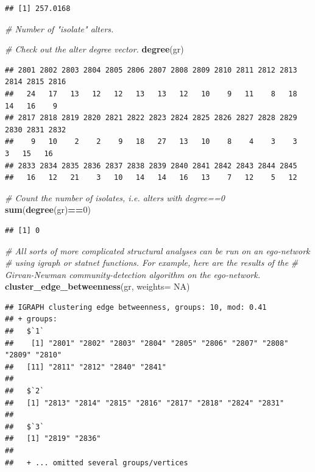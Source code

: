 \documentclass[
]{book}
\newenvironment{Shaded}{\begin{snugshade}}{\end{snugshade}}
\newcommand{\AttributeTok}[1]{\textcolor[rgb]{0.13,0.29,0.53}{#1}}
\newcommand{\CommentTok}[1]{\textcolor[rgb]{0.56,0.35,0.01}{\textit{#1}}}
\newcommand{\ConstantTok}[1]{\textcolor[rgb]{0.56,0.35,0.01}{#1}}
\newcommand{\DecValTok}[1]{\textcolor[rgb]{0.00,0.00,0.81}{#1}}
\newcommand{\FunctionTok}[1]{\textcolor[rgb]{0.13,0.29,0.53}{\textbf{#1}}}
\newcommand{\NormalTok}[1]{#1}
\newcommand{\SpecialCharTok}[1]{\textcolor[rgb]{0.81,0.36,0.00}{\textbf{#1}}}
\begin{document}
\begin{verbatim}
## [1] 257.0168
\end{verbatim}

\begin{Shaded}
\begin{Highlighting}[]
\CommentTok{\# Number of "isolate" alters.}

\CommentTok{\# Check out the alter degree vector.}
\FunctionTok{degree}\NormalTok{(gr)}
\end{Highlighting}
\end{Shaded}

\begin{verbatim}
## 2801 2802 2803 2804 2805 2806 2807 2808 2809 2810 2811 2812 2813 2814 2815 2816 
##   24   17   13   12   12   13   13   12   10    9   11    8   18   14   16    9 
## 2817 2818 2819 2820 2821 2822 2823 2824 2825 2826 2827 2828 2829 2830 2831 2832 
##    9   10    2    2    9   18   27   13   10    8    4    3    3    3   15   16 
## 2833 2834 2835 2836 2837 2838 2839 2840 2841 2842 2843 2844 2845 
##   16   12   21    3   10   14   14   16   13    7   12    5   12
\end{verbatim}

\begin{Shaded}
\begin{Highlighting}[]
\CommentTok{\# Count the number of isolates, i.e. alters with degree==0}
\FunctionTok{sum}\NormalTok{(}\FunctionTok{degree}\NormalTok{(gr)}\SpecialCharTok{==}\DecValTok{0}\NormalTok{)}
\end{Highlighting}
\end{Shaded}

\begin{verbatim}
## [1] 0
\end{verbatim}

\begin{Shaded}
\begin{Highlighting}[]
\CommentTok{\# All sorts of more complicated structural analyses can be run on an ego{-}network}
\CommentTok{\# using igraph or statnet functions. For example, here are the results of the}
\CommentTok{\# Girvan{-}Newman community{-}detection algorithm on the ego{-}network.}
\FunctionTok{cluster\_edge\_betweenness}\NormalTok{(gr, }\AttributeTok{weights=} \ConstantTok{NA}\NormalTok{)}
\end{Highlighting}
\end{Shaded}

\begin{verbatim}
## IGRAPH clustering edge betweenness, groups: 10, mod: 0.41
## + groups:
##   $`1`
##    [1] "2801" "2802" "2803" "2804" "2805" "2806" "2807" "2808" "2809" "2810"
##   [11] "2811" "2812" "2840" "2841"
##   
##   $`2`
##   [1] "2813" "2814" "2815" "2816" "2817" "2818" "2824" "2831"
##   
##   $`3`
##   [1] "2819" "2836"
##   
##   + ... omitted several groups/vertices
\end{verbatim}
\end{document}
